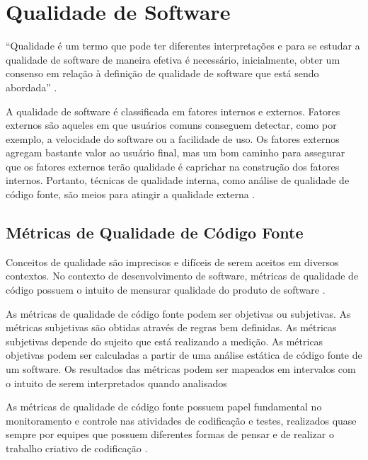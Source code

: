 \section{Qualidade de Software}

\begin{citacao}
“Qualidade é um termo que pode ter diferentes interpretações e para se estudar a qualidade de software de maneira efetiva é necessário, inicialmente, obter um consenso em relação à definição de qualidade de software que está sendo abordada” \cite[pág.~11]{braga2012}.
\end{citacao}

A qualidade de software é classificada em fatores internos e externos. Fatores externos são aqueles em que usuários comuns conseguem detectar, como por exemplo, a velocidade do software ou a facilidade de uso. Os fatores externos agregam bastante valor ao usuário final, mas um bom caminho para assegurar que os fatores externos terão qualidade é caprichar na construção dos fatores internos. Portanto, técnicas de qualidade interna, como análise de qualidade de código fonte, são meios para atingir a qualidade externa \cite[pág.~4]{bueno2011}.

\subsection{Métricas de Qualidade de Código Fonte}

Conceitos de qualidade são imprecisos e difíceis de serem aceitos em diversos contextos. No contexto de desenvolvimento de software, métricas de qualidade de código possuem o intuito de mensurar qualidade do produto de software \cite[pág.~1]{bueno2011}.

As métricas de qualidade de código fonte podem ser objetivas ou subjetivas. As métricas subjetivas são obtidas através de regras bem definidas. As métricas subjetivas depende do sujeito que está realizando a medição. As métricas objetivas podem ser calculadas a partir de uma análise estática de código fonte de um software. Os resultados das métricas podem ser mapeados em intervalos com o intuito de serem interpretados quando analisados \cite[pág.~14]{meirelles2013}

As métricas de qualidade de código fonte possuem papel fundamental no monitoramento e controle nas atividades de codificação e testes, realizados quase sempre por equipes que possuem diferentes formas de pensar e de realizar o trabalho criativo de codificação \cite[pág.~341]{sommerville}.


